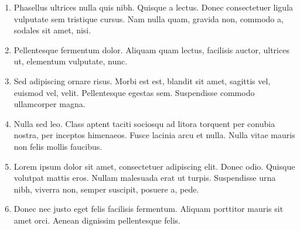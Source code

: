 \documentclass[a4paper]{article}
\begin{document}
\begin{multicols}{3}
\begin{enumerate}[leftmargin=0.3cm]
    \item{Phasellus ultrices nulla quis nibh. Quisque a lectus. Donec consectetuer ligula vulputate sem tristique cursus. Nam nulla quam, gravida non, commodo a, sodales sit amet, nisi.} %
    \item{Pellentesque fermentum dolor. Aliquam quam lectus, facilisis auctor, ultrices ut, elementum vulputate, nunc.} %
    \item{Sed adipiscing ornare risus. Morbi est est, blandit sit amet, sagittis vel, euismod vel, velit. Pellentesque egestas sem. Suspendisse commodo ullamcorper magna.} %
    \item{Nulla sed leo. Class aptent taciti sociosqu ad litora torquent per conubia nostra, per inceptos himenaeos.
          Fusce lacinia arcu et nulla. Nulla vitae mauris non felis mollis faucibus.} %
    \item{Lorem ipsum dolor sit amet, consectetuer adipiscing elit. Donec odio. Quisque volutpat mattis eros. Nullam malesuada erat ut turpis. Suspendisse urna nibh, viverra non, semper suscipit, posuere a, pede.} %
    \item{Donec nec justo eget felis facilisis fermentum. Aliquam porttitor mauris sit amet orci. Aenean dignissim pellentesque felis.} %

\end{enumerate}
\end{multicols}
\end{document}
